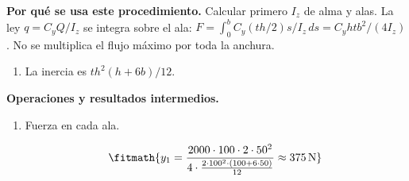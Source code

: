 \noindent\textbf{Por qué se usa este procedimiento.} Calcular primero $I_z$ de alma y alas. La ley $q=C_yQ/I_z$ se integra sobre el ala: $F=\int_0^b C_y(th/2)s/I_z\,ds=C_yhtb^2/(4I_z)$. No se multiplica el flujo máximo por toda la anchura.

\begin{enumerate}

\item La inercia es $t h^2 (h + 6b)/12$.

\end{enumerate}

\noindent\textbf{Operaciones y resultados intermedios.}

\begin{enumerate}

\item Fuerza en cada ala.

\[\fitmath{y_{1}=\frac{2000\cdot 100\cdot 2\cdot {50}^{2}}{4\cdot \frac{2\cdot {100}^{2}\cdot \left(100+6\cdot 50\right)}{12}}\approx 375\,\mathrm{N}}\]

\end{enumerate}
